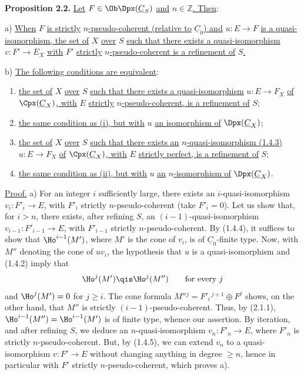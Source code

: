 %
\textbf{Proposition 2.2.} \uline{Let} \(F\in\Ob\Dpx(\underline{C}_S)\) \uline{and} \(n\in\mathbb Z\)\uline{. Then}:

a) \uline{When} \(F\) \uline{is strictly} \(n\)\uline{-pseudo-coherent (relative to} \(\underline{C}_0\)\uline{) and} \(u:E\to F\) \uline{is a quasi-isomorphism, the set of} \(X\) \uline{over} \(S\) \uline{such that there exists a quasi-isomorphism} \(v:F'\longrightarrow E_X\) \uline{with} \(F'\) \uline{strictly} \(n\)\uline{-pseudo-coherent is a refinement of} \(S\)\uline{.}

b) \uline{The following conditions are equivalent}:
\begin{enumerate}[label=(\roman*)]
\item \uline{the set of} \(X\) \uline{over} \(S\) \uline{such that there exists a quasi-isomorphism} \(u:E\longrightarrow F_X\) \uline{of} \(\Cpx(\underline{C}_X)\)\uline{, with} \(E\) \uline{strictly} \(n\)\uline{-pseudo-coherent, is a refinement of} \(S\);
\item[\((\mathrm{i}')\)] \uline{the same condition as (i), but with} \(u\) \uline{an isomorphism of} \(\Dpx(\underline{C}_X)\);
\item \uline{the set of} \(X\) \uline{over} \(S\) \uline{such that there exists an} \(n\)\uline{-quasi-isomorphism (1.4.3)} \(u:E\longrightarrow F_X\) \uline{of} \(\Cpx(\underline{C}_X)\)\uline{, with} \(E\) \uline{strictly perfect, is a refinement of} \(S\);
\item[\((\mathrm{ii}')\)] \uline{the same condition as (ii), but with} \(u\) \uline{an} \(n\)\uline{-isomorphism of} \(\Dpx(\underline{C}_X)\).
\end{enumerate}

\uline{Proof.} a) For an integer \(i\) sufficiently large, there exists an \(i\)-quasi-isomorphism \(v_i:F'_i\longrightarrow E\), with \(F'_i\) strictly \(n\)-pseudo-coherent (take \(F'_i=0\)). Let us show that, for \(i>n\), there exists, after refining \(S\), an \((i-1)\)-quasi-isomorphism \(v_{i-1}:F'_{i-1}\longrightarrow E\), with \(F'_{i-1}\) strictly \(n\)-pseudo-coherent. By (1.4.4), it suffices to show that \(\Ho^{i-1}(M')\), where \(M'\) is the cone of \(v_i\), is of \(\underline{C}_0\)-finite type. Now, with \(M''\) denoting the cone of \(uv_i\), the hypothesis that \(u\) is a quasi-isomorphism and (1.4.2) imply that
\[
  \Ho^j(M')\qis \Ho^j(M'')\qquad\text{for every }j
\]
and \(\Ho^j(M')=0\) for \(j\geq i\).
%
The cone formula \(M''{}^j=F'_i{}^{\,j+1}\oplus F^j\) shows, on the other hand, that \(M''\) is strictly \((i-1)\)-pseudo-coherent. Thus, by (2.1.1), \(\Ho^{i-1}(M'')=\Ho^{i-1}(M')\) is of finite type, whence our assertion. By iteration, and after refining \(S\), we deduce an \(n\)-quasi-isomorphism \(v_n:F'_n\longrightarrow E\), where \(F'_n\) is strictly \(n\)-pseudo-coherent. But, by (1.4.5), we can extend \(v_n\) to a quasi-isomorphism \(v:F'\longrightarrow E\) without changing anything in degree \(\geq n\), hence in particular with \(F'\) strictly \(n\)-pseudo-coherent, which proves a).


